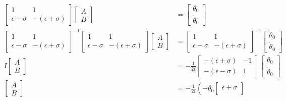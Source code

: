 \documentclass{article}
\begin{document}
\begin{align*}
	\begin{bmatrix}
		1 & 1 \\
		\epsilon - \sigma & -(\epsilon + \sigma)
	\end{bmatrix}
	\begin{bmatrix}
		A \\
		B
	\end{bmatrix}
	&=
	\begin{bmatrix}
		\theta_0 \\
		\dot{\theta}_0
	\end{bmatrix} \\
	\begin{bmatrix}
		1 & 1 \\
		\epsilon - \sigma & -(\epsilon + \sigma)
	\end{bmatrix}^{-1}
	\begin{bmatrix}
		1 & 1 \\
		\epsilon - \sigma & -(\epsilon + \sigma)
	\end{bmatrix}
	\begin{bmatrix}
		A \\
		B
	\end{bmatrix}
	&=
	\begin{bmatrix}
		1 & 1 \\
		\epsilon - \sigma & -(\epsilon + \sigma)
	\end{bmatrix}^{-1}
	\begin{bmatrix}
		\theta_0 \\
		\dot{\theta}_0
	\end{bmatrix} \\
	I
	\begin{bmatrix}
		A \\
		B
	\end{bmatrix}
	&=
	-\frac{1}{2\epsilon}
	\begin{bmatrix}
		-(\epsilon + \sigma) & -1 \\
		-(\epsilon - \sigma) & 1
	\end{bmatrix}
	\begin{bmatrix}
		\theta_0 \\
		\dot{\theta}_0
	\end{bmatrix} \\
	\begin{bmatrix}
		A \\
		B
	\end{bmatrix}
	&=
	-\frac{1}{2\epsilon}
	\left(
	- \theta_0
	\begin{bmatrix}
		\epsilon + \sigma \\

\end{bmatrix}
\end{align*}
\end{document}

